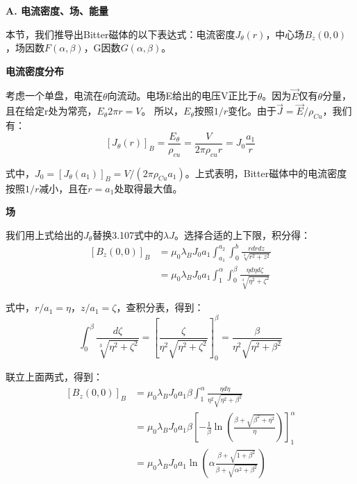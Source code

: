 \textbf{A. 电流密度、场、能量}

本节，我们推导出Bitter磁体的以下表达式：电流密度$J_\theta (r)$，中心场$B_z(0,0)$，场因数$F(\alpha,\beta)$，G因数$G(\alpha,\beta)$。

\textbf{电流密度分布}

考虑一个单盘，电流在$\theta$向流动。电场E给出的电压V正比于$\theta$。因为$\vec{E}$仅有$\theta$分量，且在给定r处为常亮，$E_\theta 2\pi r=V$。
所以，$E_\theta$按照$1/r$变化。由于$\vec{J}=\vec{E}/\rho_{Cu}$，我们有：
\begin{equation}
{[J_\theta(r)]}_B=\frac{E_{\theta}}{\rho_{cu}}=\frac{V}{2\pi\rho_{cu}r}=J_0\frac{a_1}{r}%
\end{equation}

式中，$J_0=[J_\theta(a_1)]_B=V/(2\pi \rho_{Cu} a_1)$。上式表明，Bitter磁体中的电流密度按照$1/r$减小，且在$r=a_1$处取得最大值。

\textbf{场}

我们用上式给出的$J_\theta$替换3.107式中的$\lambda J$。选择合适的上下限，积分得：
\begin{equation}
\begin{split}
{[B_z(0,0)]}_B&=\mu_0\lambda_B J_0a_1\int_{a_1}^{a_2}\int_{0}^{b}\frac{r dr dz}{\sqrt[3]{r^2+z^2}}\\
&=\mu_0\lambda_B J_0 a_1\int_{1}^{\alpha}\int_{0}^{\beta}\frac{\eta d\eta d\zeta}{\sqrt[3]{\eta^2+\zeta^2}}%
\end{split}
\end{equation}

式中，$r/a_1=\eta$，$z/a_1=\zeta$，查积分表，得到：
\begin{equation}
\int_{0}^{\beta}\frac{d\zeta}{\sqrt[3]{\eta^2+\zeta^2}}=\left[\frac{\zeta}{\eta^2\sqrt{\eta^2+\zeta^2}}\right]_0^{\beta}=\frac{\beta}{\eta^2\sqrt{\eta^2+\beta^2}}%
\end{equation}

联立上面两式，得到：
\begin{equation}
\begin{split}
{[B_z(0,0)]}_B&=\mu_0\lambda_B J_0a_1\beta\int_{1}^{\alpha}\frac{\eta d\eta}{\eta^2\sqrt{\eta^2+\beta^2}}\\
&=\mu_0\lambda_B J_0a_1\beta\left[-\frac{1}{\beta}\ln(\frac{\beta+\sqrt{\beta^2+\eta^2}}{\eta})\right]_1^{\alpha}\\ %
&=\mu_0\lambda_B J_0a_1\ln\left(\alpha\frac{\beta+\sqrt{1+\beta^2}}{\beta+\sqrt{\alpha^2+\beta^2}}\right)%
\end{split}
\end{equation}

